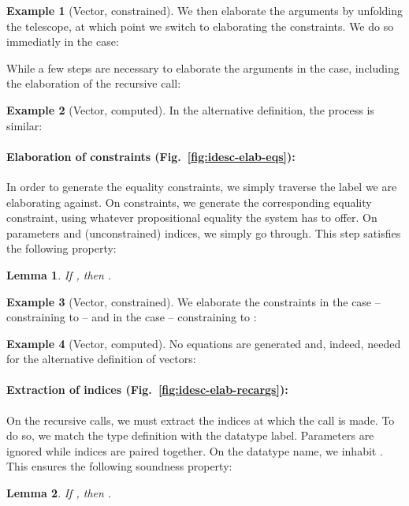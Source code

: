 \documentclass{scrartcl}
\theoremstyle{plain}
\newtheorem{lemma}{Lemma}
\theoremstyle{definition}
\newtheorem{example}{Example}
\begin{document}
\begin{example}[Vector, constrained]

We then elaborate the arguments by unfolding the telescope, at which
point we switch to elaborating the constraints. We do so immediatly in
the  case:

While a few steps are necessary to elaborate the arguments in the
 case, including the elaboration of the recursive call:


\end{example}



\begin{example}[Vector, computed]

In the alternative definition, the process is similar:


\end{example}




\paragraph{Elaboration of constraints (Fig.~\ref{fig:idesc-elab-eqs}):}
In order to generate the equality constraints, we simply traverse the
label we are elaborating against. On constraints, we generate the
corresponding equality constraint, using whatever propositional
equality the system has to offer. On parameters and (unconstrained)
indices, we simply go through. This step satisfies the following
property:
\begin{lemma}\label{lemma:idesc-elab-eqs}
If 
, then
.

\end{lemma}



\begin{example}[Vector, constrained]

We elaborate the constraints in the  case -- constraining
 to  -- and in the  case -- constraining 
to :


\end{example}



\begin{example}[Vector, computed]

No equations are generated and, indeed, needed for the alternative
definition of vectors:


\end{example}




\paragraph{Extraction of indices (Fig.~\ref{fig:idesc-elab-recargs}):}
On the recursive calls, we must extract the indices at which the call
is made. To do so, we match the type definition with the datatype
label. Parameters are ignored while indices are paired together. On
the datatype name, we inhabit . This ensures the following
soundness property:
\begin{lemma}\label{lemma:idesc-elab-recargs}
If 
, then
.
\end{lemma}
\end{document}
